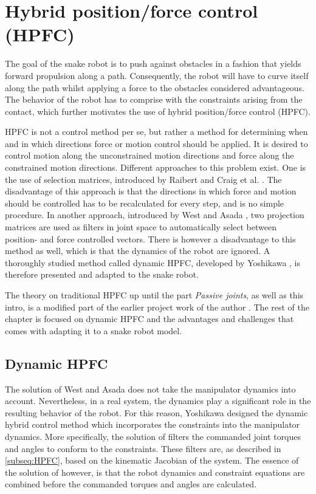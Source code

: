 \section{Hybrid position/force control (HPFC)}

The goal of the snake robot is to push against obstacles in a fashion that yields forward propulsion along a path. Consequently, the robot will have to curve itself along the path whilst applying a force to the obstacles considered advantageous. The behavior of the robot has to comprise with the constraints arising from the contact, which further motivates the use of hybrid position/force control (HPFC).

HPFC is not a control method per se, but rather a method for determining when and in which directions force or motion control should be applied. It is desired to control motion along the unconstrained motion directions and force along the constrained motion directions. Different approaches to this problem exist. One is the use of selection matrices, introduced by Raibert and Craig et al. \cite{raibert1981hybrid}. The disadvantage of this approach is that the directions in which force and motion should be controlled has to be recalculated for every step, and is no simple procedure. In another approach, introduced by West and Asada \cite{west1985method}, two projection matrices are used as filters in joint space to automatically select between position- and force controlled vectors. There is however a disadvantage to this method as well, which is that the dynamics of the robot are ignored. A thoroughly studied method called dynamic HPFC, developed by Yoshikawa \cite{yoshikawa1987dynamic}, is therefore presented and adapted to the snake robot.

The theory on traditional HPFC up until the part \textit{Passive joints}, as well as this intro, is a modified part of the earlier project work of the author \cite{AtussaProsjektoppgp}. The rest of the chapter is focused on dynamic HPFC and the advantages and challenges that comes with adapting it to a snake robot model.



\subsection{Dynamic HPFC} \label{subsec:DHPFC}

The solution of West and Asada \cite{west1985method} does not take the manipulator dynamics into account. Nevertheless, in a real system, the dynamics play a significant role in the resulting behavior of the robot. For this reason, Yoshikawa \cite{yoshikawa1987dynamic} designed the dynamic hybrid control method which incorporates the constraints into the manipulator dynamics. More specifically, the solution of \cite{west1985method} filters the commanded joint torques and angles to conform to the constraints. These filters are, as described in \ref{subseq:HPFC}, based on the kinematic Jacobian of the system. The essence of the solution of \cite{yoshikawa1987dynamic} however, is that the robot dynamics and constraint equations are combined before the commanded torques and angles are calculated. 

